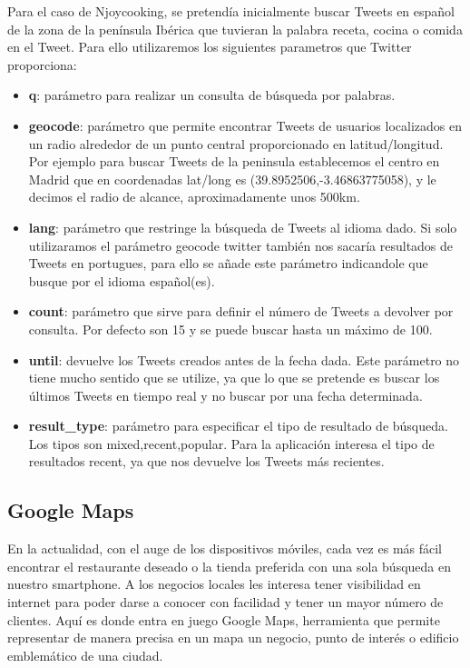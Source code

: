 Para el caso de Njoycooking, se pretendía inicialmente buscar Tweets en español de la zona de la península Ibérica que tuvieran la palabra receta, cocina o comida en el Tweet. Para ello utilizaremos los siguientes parametros que Twitter proporciona:

\begin{itemize}

\item \textbf{q}: parámetro para realizar un consulta de búsqueda por palabras.

\item \textbf{geocode}: parámetro que permite encontrar Tweets de usuarios localizados en un radio alrededor de un punto central proporcionado en latitud/longitud. Por ejemplo para buscar Tweets de la peninsula establecemos el centro en Madrid que en coordenadas lat/long es (39.8952506,-3.46863775058), y le decimos el radio de alcance, aproximadamente unos  500km.

\item \textbf{lang}: parámetro que restringe la búsqueda de Tweets al idioma dado. Si solo utilizaramos el parámetro geocode twitter también nos sacaría resultados de Tweets en portugues, para ello se añade este parámetro indicandole que busque por el idioma español(es).

\item \textbf{count}: parámetro que sirve para definir el número de Tweets a devolver por consulta. Por defecto son 15 y se puede buscar hasta un máximo de 100.


\item \textbf{until}: devuelve los Tweets creados antes de la fecha dada. Este parámetro no tiene mucho sentido que se utilize, ya que lo que se pretende es buscar los últimos Tweets en tiempo real y no buscar por una fecha determinada.

\item \textbf{result\_type}: parámetro para especificar el tipo de resultado de búsqueda. Los tipos son mixed,recent,popular. Para la aplicación interesa el tipo de resultados recent, ya que nos devuelve los Tweets más recientes.

\end{itemize}


\subsection{Google Maps}

 En la actualidad, con el auge de los dispositivos móviles, cada vez es más fácil encontrar el restaurante deseado o la tienda preferida con una sola búsqueda en nuestro smartphone. A los negocios locales les interesa tener visibilidad en internet para poder darse a conocer con facilidad y tener un mayor número de clientes. Aquí es donde entra en juego Google Maps, herramienta que permite representar de manera precisa en un mapa un negocio, punto de interés o edificio emblemático de una ciudad.

